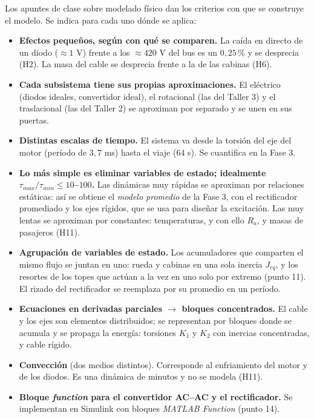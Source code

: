 \documentclass[10pt,a4paper,twocolumn]{article}
\begin{document}
Los apuntes de clase sobre modelado físico dan los criterios con que se construye el
modelo. Se indica para cada uno dónde se aplica:
\begin{itemize}
  \item \textbf{Efectos pequeños, según con qué se comparen.} La caída en directo de un
        diodo ($\approx1$ V) frente a los $\approx420$ V del bus es un $0{,}25$\,\% y se
        desprecia (H2). La masa del cable se desprecia frente a la de las cabinas (H6).
  \item \textbf{Cada subsistema tiene sus propias aproximaciones.} El eléctrico (diodos
        ideales, convertidor ideal), el rotacional (las del Taller 3) y el traslacional
        (las del Taller 2) se aproximan por separado y se unen en sus puertas.
  \item \textbf{Distintas escalas de tiempo.} El sistema va desde la torsión del eje del
        motor (período de $3{,}7$ ms) hasta el viaje ($64$ s). Se cuantifica en la Fase 3.
  \item \textbf{Lo más simple es eliminar variables de estado; idealmente
        $\tau_{max}/\tau_{min}\le 10$--$100$.} Las dinámicas muy rápidas se aproximan por
        relaciones estáticas: así se obtiene el \emph{modelo promedio} de la Fase 3, con el
        rectificador promediado y los ejes rígidos, que se usa para diseñar la excitación.
        Las muy lentas se aproximan por constantes: temperaturas, y con ello $R_a$, y masas
        de pasajeros (H11).
  \item \textbf{Agrupación de variables de estado.} Los acumuladores que comparten el
        mismo flujo se juntan en uno: rueda y cabinas en una sola inercia $J_{eq}$, y los
        resortes de los topes que actúan a la vez en uno solo por extremo (punto 11). El
        rizado del rectificador se reemplaza por su promedio en un período.
  \item \textbf{Ecuaciones en derivadas parciales $\to$ bloques concentrados.} El cable y
        los ejes son elementos distribuidos; se representan por bloques donde se acumula y
        se propaga la energía: torsiones $K_1$ y $K_2$ con inercias concentradas, y cable
        rígido.
  \item \textbf{Convección} (dos medios distintos). Corresponde al enfriamiento del motor
        y de los diodos. Es una dinámica de minutos y no se modela (H11).
  \item \textbf{Bloque \emph{function} para el convertidor AC--AC y el rectificador.} Se
        implementan en Simulink con bloques \emph{MATLAB Function} (punto 14).
\end{itemize}
\end{document}

